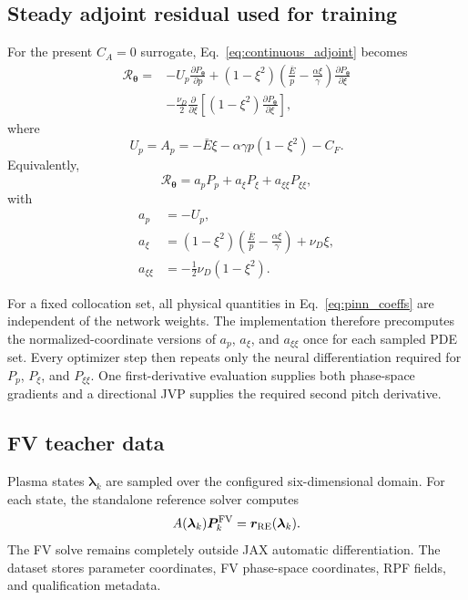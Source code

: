 \documentclass[11pt]{article}
\newcommand{\Pvec}{\bm P}
\newcommand{\rRE}{\bm r_{\rm RE}}
\newcommand{\lam}{\bm\lambda}
\newcommand{\thetaNN}{\bm\theta}
\begin{document}
\subsection{Steady adjoint residual used for training}

For the present $C_A=0$ surrogate, Eq.~\eqref{eq:continuous_adjoint} becomes
\begin{align}
 \mathcal R_{\thetaNN}
 ={}&-U_p\frac{\partial P_{\thetaNN}}{\partial p}
 +(1-\xi^2)
  \left(\frac{\bar E}{p}-\frac{\alpha\xi}{\gamma}\right)
  \frac{\partial P_{\thetaNN}}{\partial\xi}
 \nonumber\\
 &-\frac{\nu_D}{2}\frac{\partial}{\partial\xi}
 \left[(1-\xi^2)\frac{\partial P_{\thetaNN}}{\partial\xi}\right],
 \label{eq:pinn_residual}
\end{align}
where
\begin{equation}
 U_p=A_p=-\bar E\xi-\alpha\gamma p(1-\xi^2)-C_F.
\end{equation}
Equivalently,
\begin{equation}
 \mathcal R_{\thetaNN}
 =a_pP_p+a_\xi P_\xi+a_{\xi\xi}P_{\xi\xi},
 \label{eq:expanded_residual}
\end{equation}
with
\begin{align}
 a_p&=-U_p,\\
 a_\xi&=(1-\xi^2)\left(\frac{\bar E}{p}-\frac{\alpha\xi}{\gamma}\right)+\nu_D\xi,\\
 a_{\xi\xi}&=-\frac12\nu_D(1-\xi^2).
 \label{eq:pinn_coeffs}
\end{align}

For a fixed collocation set, all physical quantities in
Eq.~\eqref{eq:pinn_coeffs} are independent of the network weights.  The implementation
therefore precomputes the normalized-coordinate versions of
$a_p$, $a_\xi$, and $a_{\xi\xi}$ once for each sampled PDE set.  Every optimizer step then
repeats only the neural differentiation required for $P_p$, $P_\xi$, and $P_{\xi\xi}$.
One first-derivative evaluation supplies both phase-space gradients and a directional JVP
supplies the required second pitch derivative.

\subsection{FV teacher data}

Plasma states $\lam_k$ are sampled over the configured six-dimensional domain.  For each
state, the standalone reference solver computes
\begin{equation}
 A(\lam_k)\Pvec_k^{\rm FV}=\rRE(\lam_k).
 \label{eq:teacher}
\end{equation}
The FV solve remains completely outside JAX automatic differentiation.  The dataset stores
parameter coordinates, FV phase-space coordinates, RPF fields, and qualification metadata.
\end{document}
